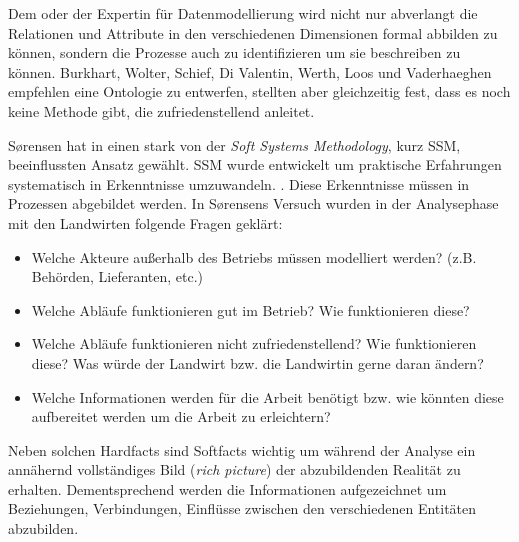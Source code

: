 Dem oder der Expertin für Datenmodellierung wird nicht nur abverlangt die Relationen und Attribute in den verschiedenen Dimensionen formal abbilden zu können, sondern die Prozesse auch zu identifizieren um sie beschreiben zu können. Burkhart, Wolter, Schief, Di Valentin, Werth, Loos und Vaderhaeghen empfehlen eine Ontologie zu entwerfen, stellten aber gleichzeitig fest, dass es noch keine Methode gibt, die zufriedenstellend anleitet.\cite{jour:Burkhart2012} 

S\o rensen hat in \cite{jour:Sorensen2010} einen stark von der \textit{Soft Systems Methodology}, kurz SSM, beeinflussten Ansatz gewählt. SSM wurde entwickelt um praktische Erfahrungen systematisch in Erkenntnisse umzuwandeln. \cite{jour:Checkland2000}. Diese Erkenntnisse müssen in Prozessen abgebildet werden. In S\o rensens Versuch wurden in der Analysephase mit den Landwirten folgende Fragen geklärt:
\begin{itemize}
 \item Welche Akteure außerhalb des Betriebs müssen modelliert werden? (z.B. Behörden, Lieferanten, etc.)
 \item Welche Abläufe funktionieren gut im Betrieb? Wie funktionieren diese?
 \item Welche Abläufe funktionieren nicht zufriedenstellend? Wie funktionieren diese? Was würde der Landwirt bzw. die Landwirtin gerne daran ändern?
 \item Welche Informationen werden für die Arbeit benötigt bzw. wie könnten diese aufbereitet werden um die Arbeit zu erleichtern?
\end{itemize}

Neben solchen Hardfacts sind Softfacts wichtig um während der Analyse ein annähernd vollständiges Bild (\textit{rich picture}) der abzubildenden Realität zu erhalten. Dementsprechend werden die Informationen aufgezeichnet um Beziehungen, Verbindungen, Einflüsse zwischen den verschiedenen Entitäten abzubilden.

